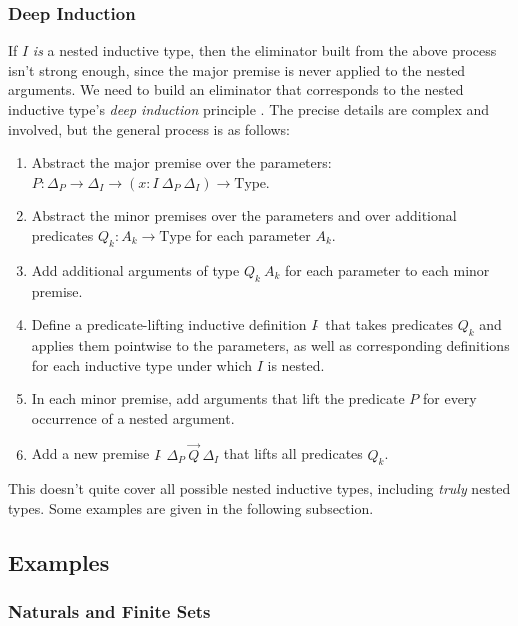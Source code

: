 \documentclass{report}
\newcommand{\const}[1]{\text{#1}}
\newcommand{\Type}{\const{Type}}
\begin{document}
\subsubsection{Deep Induction}

If $I$ \emph{is} a nested inductive type, then the eliminator built from the above process isn't strong enough, since the major premise is never applied to the nested arguments. We need to build an eliminator that corresponds to the nested inductive type's \emph{deep induction} principle \citep{deep-ind}. The precise details are complex and involved, but the general process is as follows:

\begin{enumerate}
    \item Abstract the major premise over the parameters: $P: \Delta_P \to \Delta_I \to (x: I ~ \Delta_P ~ \Delta_I) \to \Type$.
    \item Abstract the minor premises over the parameters and over additional predicates $Q_k: A_k \to \Type$ for each parameter $A_k$.
    \item Add additional arguments of type $Q_k ~ A_k$ for each parameter to each minor premise.
    \item Define a predicate-lifting inductive definition $I\hat{~}$ that takes predicates $Q_k$ and applies them pointwise to the parameters, as well as corresponding definitions for each inductive type under which $I$ is nested.
    \item In each minor premise, add arguments that lift the predicate $P$ for every occurrence of a nested argument.
    \item Add a new premise $I\hat{~} ~ \Delta_P ~ \Vec{Q} ~ \Delta_I$ that lifts all predicates $Q_k$.
\end{enumerate}

This doesn't quite cover all possible nested inductive types, including \emph{truly} nested types. Some examples are given in the following subsection.

\subsection{Examples}

\subsubsection{Naturals and Finite Sets}
\end{document}
